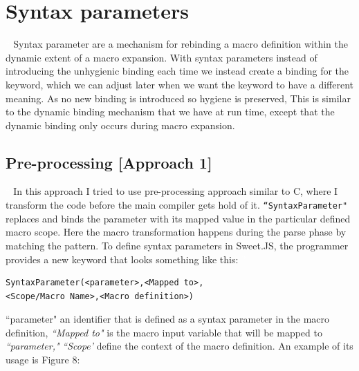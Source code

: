 \chapter{Syntax parameters}
\textcolor{white}{``}
Syntax parameter are a mechanism for rebinding a macro definition within the dynamic extent of a macro expansion. With syntax parameters instead of introducing the unhygienic binding each time we instead create a binding for the keyword, which we can adjust later when we want the keyword to have a different meaning. As no new binding is introduced so hygiene is preserved, This is similar to the dynamic binding mechanism that we have at run time, except that the dynamic binding only occurs during macro expansion.
\textcolor{white}{''}
\section{Pre-processing [Approach 1]}
\textcolor{white}{``}
In this approach I tried to use pre-processing approach similar to C, where I transform the code before the main compiler gets hold of it. \texttt{``SyntaxParameter"} replaces and binds the parameter with its mapped value in the particular defined macro scope. Here the macro transformation happens during the parse phase by matching the pattern. To define syntax parameters in Sweet.JS, the programmer provides a new keyword that looks something like this:  
\textcolor{white}{''}
\begin{lstlisting}[frame=single]
SyntaxParameter(<parameter>,<Mapped to>,
<Scope/Macro Name>,<Macro definition>)
\end{lstlisting}

``parameter" an identifier that is defined as a syntax parameter in the macro definition, \textit{``Mapped to"} is the macro input variable that will be mapped to \textit{``parameter,"} \textit{``Scope'} define the context of the macro definition.
\newpage
An example of its usage is Figure 8:

